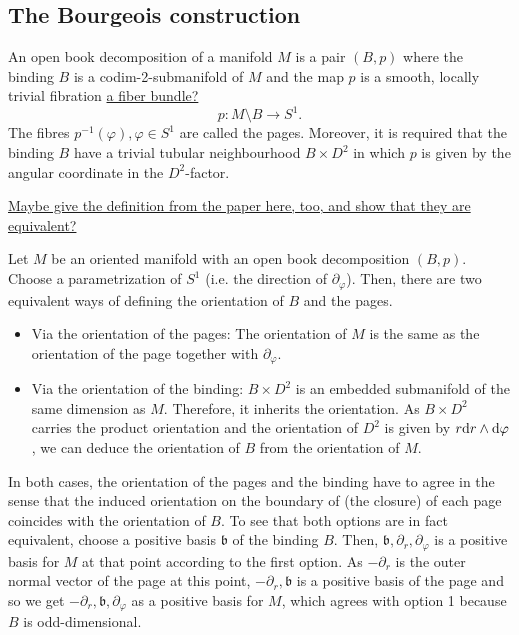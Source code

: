 \subsection*{The Bourgeois construction}

\begin{definition}
    An open book decomposition of a manifold $M$ is a pair $(B,p)$ where the binding $B$ is a codim-2-submanifold of $M$ and the map $p$ is a smooth, locally trivial fibration \underline{a fiber bundle?}
    \[
        p: M\setminus B \to S^1.
    \]
    The fibres $p^{-1}(\varphi), \varphi \in S^1$ are called the pages.
    Moreover, it is required that the binding $B$ have a trivial tubular neighbourhood $B\times D^2$ in which $p$ is given by the angular coordinate in the $D^2$-factor.
\end{definition}

\underline{Maybe give the definition from the paper here, too, and show that they are equivalent?}

\begin{remark}
    Let $M$ be an oriented manifold with an open book decomposition $(B,p)$.
    Choose a parametrization of $S^1$ (i.e. the direction of $\partial_\varphi$).
    Then, there are two equivalent ways of defining the orientation of $B$ and the pages.
    \begin{itemize}
        \item Via the orientation of the pages: The orientation of $M$ is the same as the orientation of the page together with $\partial_\varphi$.
        \item Via the orientation of the binding: $B \times D^2$ is an embedded submanifold of the same dimension as $M$. Therefore, it inherits the orientation. As $B \times D^2$ carries the product orientation and the orientation of $D^2$ is given by $r \mathrm{d} r \wedge \mathrm{d} \varphi$, we can deduce the orientation of $B$ from the orientation of $M$.
    \end{itemize}
    In both cases, the orientation of the pages and the binding have to agree in the sense that the induced orientation on the boundary of (the closure) of each page coincides with the orientation of $B$.
    To see that both options are in fact equivalent, choose a positive basis $\mathfrak{b}$ of the binding $B$. Then, $\mathfrak{b}, \partial_r, \partial_\varphi$ is a positive basis for $M$ at that point according to the first option.
    As $- \partial_r$ is the outer normal vector of the page at this point, $-\partial_r, \mathfrak{b}$ is a positive basis of the page and so we get $-\partial_r, \mathfrak{b}, \partial_\varphi$ as a positive basis for $M$, which agrees with option 1 because $B$ is odd-dimensional.
\end{remark}

